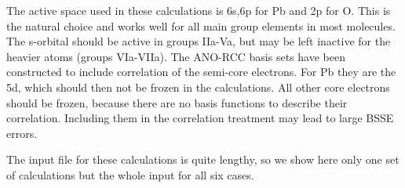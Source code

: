 The active space used in these calculations is 6s,6p for Pb and 2p for O. This
is the natural choice and works well for all main group elements in most
molecules. The s-orbital should be active in groups IIa-Va, but may be left
inactive for the heavier atoms (groups VIa-VIIa). The ANO-RCC basis sets have
been constructed to include correlation of the semi-core electrons. For Pb they
are the 5d, which should then not be frozen in the  
calculations. All other core electrons should be frozen, because there are no
basis functions to describe their correlation. Including them in the correlation
treatment may lead to large BSSE errors.

The input file for these calculations is quite lengthy, so we show here only one
set of  calculations but the whole  input 
for all six cases.
